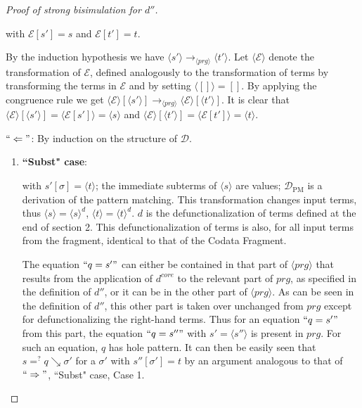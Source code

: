 \documentclass[11pt]{article} %
\begin{document}
\begin{proof}[Proof of strong bisimulation for $d''$]
\begin{enumerate}
with $\mathcal{E}[s'] = s$ and $\mathcal{E}[t'] = t$.

By the induction hypothesis we have $\langle s' \rangle \longrightarrow_{\langle prg \rangle} \langle t' \rangle$. Let $\langle \mathcal{E} \rangle$ denote the transformation of $\mathcal{E}$, defined analogously to the transformation of terms by transforming the terms in $\mathcal{E}$ and by setting $\langle [] \rangle = []$. By applying the congruence rule we get $\langle \mathcal{E} \rangle[\langle s' \rangle] \longrightarrow_{\langle prg \rangle} \langle \mathcal{E} \rangle[\langle t' \rangle]$. It is clear that $\langle \mathcal{E} \rangle[\langle s' \rangle] = \langle \mathcal{E}[s'] \rangle = \langle s \rangle$ and $\langle \mathcal{E} \rangle[\langle t' \rangle] = \langle \mathcal{E}[t'] \rangle = \langle t \rangle$.

\end{enumerate}

$`` \Leftarrow "$: By induction on the structure of $\mathcal{D}$.

\begin{enumerate}
\item \textbf{``Subst" case}:

\begin{prooftree}
\end{prooftree}

with $s'[\sigma] = \langle t \rangle$; the immediate subterms of $\langle s \rangle$ are values; $\mathcal{D}_{\textrm{PM}}$ is a derivation of the pattern matching. This transformation changes input terms, thus $\langle s \rangle = \langle s \rangle^d$, $\langle t \rangle = \langle t \rangle^d$. $d$ is the defunctionalization of terms defined at the end of section 2. This defunctionalization of terms is also, for all input terms from the fragment, identical to that of the Codata Fragment.

The equation $`` q = s' "$ can either be contained in that part of $\langle prg \rangle$ that results from the application of $d^{core}$ to the relevant part of $prg$, as specified in the definition of $d''$, or it can be in the other part of $\langle prg \rangle$. As can be seen in the definition of $d''$, this other part is taken over unchanged from $prg$ except for defunctionalizing the right-hand terms. Thus for an equation $`` q = s' "$ from this part, the equation $`` q = s'' "$ with $s' = \langle s'' \rangle$ is present in $prg$. For such an equation, $q$ has hole pattern. It can then be easily seen that $s =^? q \searrow \sigma'$ for a $\sigma'$ with $s''[\sigma'] = t$ by an argument analogous to that of $`` \Rightarrow "$, ``Subst" case, Case 1.


\end{enumerate}
\end{proof}
\end{document}
